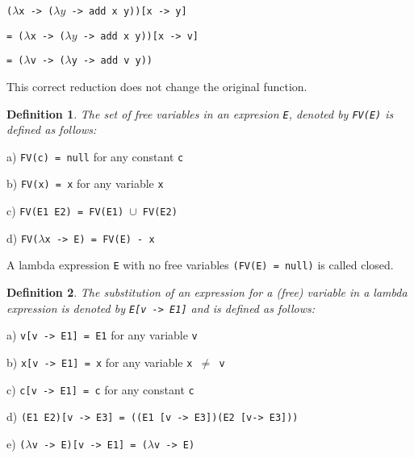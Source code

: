 \documentclass[11pt]{article}
\newtheorem{definition}{Definition}
\begin{document}
\hspace{2cm}\texttt{($\lambda$x -> ($\lambda y$ -> add x y))[x -> y]}

\parskip 0pt
\hspace{2.5cm}\texttt{= ($\lambda$x -> ($\lambda y$ -> add x y))[x -> v]}

\parskip 0pt
\hspace{2.5cm}\texttt{= ($\lambda$v -> ($\lambda$y -> add v y))}

\parskip 6pt
This correct reduction does not change the original function. 

\begin{definition}
The set of free variables in an expresion \emph{\texttt{E}}, denoted by \emph{\texttt{FV(E)}} is defined as follows:
\end{definition}

\hspace{1cm}a) \texttt{FV(c) = null} for any constant \texttt{c}

\hspace{1cm}b) \texttt{FV(x) = {x}} for any variable \texttt{x}

\hspace{1cm}c) \texttt{FV(E1 E2) = FV(E1) $\cup$ FV(E2)}

\hspace{1cm}d) \texttt{FV($\lambda$x -> E) = FV(E) - {x}}

A lambda expression \texttt{E} with no free variables \texttt{(FV(E) = null)} is called closed.

\begin{definition}
The substitution of an expression for a (free) variable in a lambda expression is denoted by \emph{\texttt{E[v -> E1]}} and is defined as follows:
\end{definition}

\hspace{1cm}a) \texttt{v[v -> E1] = E1} for any variable \texttt{v}

\hspace{1cm}b) \texttt{x[v -> E1] = x} for any variable \texttt{x $\neq$ v}

\hspace{1cm}c) \texttt{c[v -> E1] = c} for any constant \texttt{c}

\hspace{1cm}d) \texttt{(E1 E2)[v -> E3] = ((E1 [v -> E3])(E2 [v-> E3]))}

\hspace{1cm}e) \texttt{($\lambda$v -> E)[v -> E1] = ($\lambda$v -> E)}
\end{document}
